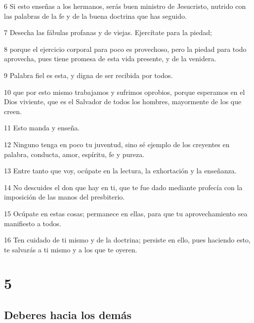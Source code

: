 \par 6 Si esto enseñas a los hermanos, serás buen ministro de Jesucristo, nutrido con las palabras de la fe y de la buena doctrina que has seguido.
\par 7 Desecha las fábulas profanas y de viejas. Ejercítate para la piedad;
\par 8 porque el ejercicio corporal para poco es provechoso, pero la piedad para todo aprovecha, pues tiene promesa de esta vida presente, y de la venidera.
\par 9 Palabra fiel es esta, y digna de ser recibida por todos.
\par 10 que por esto mismo trabajamos y sufrimos oprobios, porque esperamos en el Dios viviente, que es el Salvador de todos los hombres, mayormente de los que creen.
\par 11 Esto manda y enseña.
\par 12 Ninguno tenga en poco tu juventud, sino sé ejemplo de los creyentes en palabra, conducta, amor, espíritu, fe y pureza.
\par 13 Entre tanto que voy, ocúpate en la lectura, la exhortación y la enseñanza.
\par 14 No descuides el don que hay en ti, que te fue dado mediante profecía con la imposición de las manos del presbiterio.
\par 15 Ocúpate en estas cosas; permanece en ellas, para que tu aprovechamiento sea manifiesto a todos.
\par 16 Ten cuidado de ti mismo y de la doctrina; persiste en ello, pues haciendo esto, te salvarás a ti mismo y a los que te oyeren.

\chapter{5}

\section*{Deberes hacia los demás}

